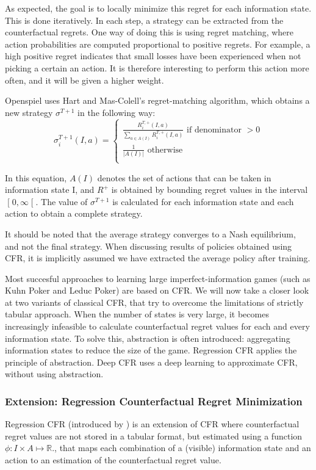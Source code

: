 \documentclass[10pt,a4paper]{article}
\begin{document}
As expected, the goal is to locally minimize this regret for each information state. This is done iteratively. In each step, a strategy can be extracted from the counterfactual regrets. One way of doing this is using regret matching, where action probabilities are computed proportional to positive regrets. For example, a high positive regret indicates that small losses have been experienced when not picking a certain an action. It is therefore interesting to perform this action more often, and it will be given a higher weight.

Openspiel uses Hart and Mas-Colell's regret-matching algorithm, which obtains a new strategy $\sigma^{T+1}$ in the following way:
\begin{equation}
\sigma_{i}^{T+1}(I,a) = 
	\begin{cases}
	\frac{R_{i}^{T,+}(I,a)}{\sum_{a \in A(I)}{R_{i}^{T,+}(I,a)}} \text{ if denominator }> 0 \\
	\frac{1}{|A(I)|} \text{ otherwise}\\
	\end{cases}
\end{equation}

In this equation, $A(I)$ denotes the set of actions that can be taken in information state I, and $R^+$ is obtained by bounding regret values in the interval $\mathclose[0,\infty\mathclose[$. The value of $\sigma^{T+1}$ is calculated for each information state and each action to obtain a complete strategy.

It should be noted that the average strategy converges to a Nash equilibrium, and not the final strategy. When discussing results of policies obtained using CFR, it is implicitly assumed we have extracted the average policy after training.

Most succesful approaches to learning large imperfect-information games (such as Kuhn Poker and Leduc Poker) are based on CFR. We will now take a closer look at two variants of classical CFR, that try to overcome the limitations of strictly tabular approach. When the number of states is very large, it becomes increasingly infeasible to calculate counterfactual regret values for each and every information state. To solve this, abstraction is often introduced: aggregating information states to reduce the size of the game. Regression CFR applies the principle of abstraction. Deep CFR uses a deep learning to approximate CFR, without using abstraction.\citep{dcfr}

\subsubsection{Extension: Regression Counterfactual Regret Minimization}
\label{sub:rcfr}
Regression CFR (introduced by \citeauthor{regression_cfr} \citep{regression_cfr}) is an extension of CFR where counterfactual regret values are not stored in a tabular format, but estimated using a function $\phi: I \times A \mapsto \mathbb{R}$., that maps each combination of a (visible) information state and an action to an estimation of the counterfactual regret value.\\
\end{document}
